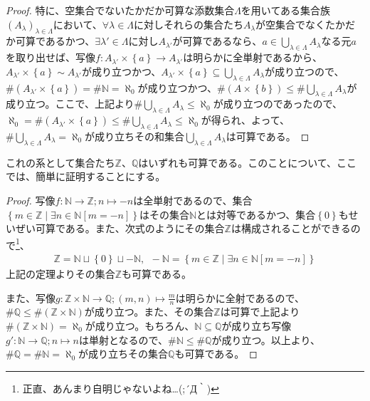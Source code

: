\documentclass[dvipdfmx]{jsarticle}
\begin{document}
\begin{proof}
特に、空集合でないたかだか可算な添数集合$\varLambda$を用いてある集合族$\left( A_{\lambda} \right)_{\lambda \in \varLambda}$において、$\forall\lambda \in \varLambda$に対しそれらの集合たち$A_{\lambda}$が空集合でなくたかだか可算であるかつ、$\exists\lambda' \in \varLambda$に対し$A_{\lambda'}$が可算であるなら、$a \in \bigcup_{\lambda \in \varLambda} A_{\lambda}$なる元$a$を取り出せば、写像$f:A_{\lambda'} \times \left\{ a \right\} \rightarrow A_{\lambda'}$は明らかに全単射であるから、$A_{\lambda'} \times \left\{ a \right\} \sim A_{\lambda'}$が成り立つかつ、$A_{\lambda'} \times \left\{ a \right\} \subseteq \bigcup_{\lambda \in \varLambda} A_{\lambda}$が成り立つので、$\# \left( A_{\lambda'} \times \left\{ a \right\} \right) = \# \mathbb{N} = \aleph_{0}$が成り立つかつ、$\# \left( A \times \left\{ b \right\} \right) \leq \# {\bigcup_{\lambda \in \varLambda} A_{\lambda}}$が成り立つ。ここで、上記より$\# {\bigcup_{\lambda \in \varLambda} A_{\lambda}} \leq \aleph_{0}$が成り立つのであったので、$\aleph_{0} = \# \left( A_{\lambda'} \times \left\{ a \right\} \right) \leq \# {\bigcup_{\lambda \in \varLambda} A_{\lambda}} \leq \aleph_{0}$が得られ、よって、$\# {\bigcup_{\lambda \in \varLambda} A_{\lambda}} = \aleph_{0}$が成り立ちその和集合$\bigcup_{\lambda \in \varLambda} A_{\lambda}$は可算である。
\end{proof}
\begin{thm}\label{1.2.7.8}
これの系として集合たち$\mathbb{Z}$、$\mathbb{Q}$はいずれも可算である。このことについて、ここでは、簡単に証明することにする。
\end{thm}
\begin{proof}
写像$f:\mathbb{N} \rightarrow \mathbb{Z};n \mapsto - n$は全単射であるので、集合$\left\{ m \in \mathbb{Z} \middle| \exists n \in \mathbb{N}[ m = - n] \right\}$はその集合$\mathbb{N}$とは対等であるかつ、集合$\left\{ 0 \right\}$もせいぜい可算である。また、次式のようにその集合$\mathbb{Z}$は構成されることができるので\footnote{正直、あんまり自明じゃないよね…(;´Д｀)}、
\begin{align*}
\mathbb{Z} = \mathbb{N} \sqcup \left\{ 0 \right\} \sqcup - \mathbb{N},\ \  - \mathbb{N} = \left\{ m \in \mathbb{Z} \middle| \exists n \in \mathbb{N}[ m = - n] \right\}
\end{align*}
上記の定理よりその集合$\mathbb{Z}$も可算である。\par
また、写像$g:\mathbb{Z} \times \mathbb{N} \rightarrow \mathbb{Q};(m,n) \mapsto \frac{m}{n}$は明らかに全射であるので、$\# \mathbb{Q} \leq \# \left( \mathbb{Z} \times \mathbb{N} \right)$が成り立つ。また、その集合$\mathbb{Z}$は可算で上記より$\# \left( \mathbb{Z} \times \mathbb{N} \right) = \aleph_{0}$が成り立つ。もちろん、$\mathbb{N} \subseteq \mathbb{Q}$が成り立ち写像$g':\mathbb{N} \rightarrow \mathbb{Q};n \mapsto n$は単射となるので、$\# \mathbb{N} \leq \# \mathbb{Q}$が成り立つ。以上より、$\# \mathbb{Q} = \# \mathbb{N} = \aleph_{0}$が成り立ちその集合$\mathbb{Q}$も可算である。
\end{proof}
\end{document}
